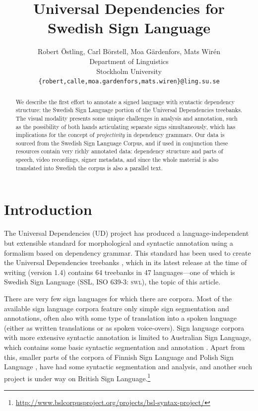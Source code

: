 \documentclass[11pt]{article}
\title{Universal Dependencies for Swedish Sign Language}
\author{Robert {\"O}stling, Carl B{\"o}rstell,
    Moa G{\"a}rdenfors, Mats Wir{\'e}n \\
  Department of Linguistics \\
  Stockholm University \\
  {\tt \{robert,calle,moa.gardenfors,mats.wiren\}@ling.su.se} \\}
\date{}
\begin{document}
\maketitle
\begin{abstract}
    We describe the first effort to annotate a signed language with syntactic
    dependency structure: the Swedish Sign Language portion of the
    Universal Dependencies treebanks.
    The visual modality presents some unique challenges in analysis and
    annotation, such as the possibility of
    both hands articulating separate signs simultaneously, which has
    implications for the concept of \emph{projectivity} in dependency grammars.
    Our data is sourced from the Swedish Sign Language Corpus,
    and if used in conjunction these resources contain very richly
    annotated data: dependency structure and parts of speech,
    video recordings, signer metadata, and since the whole material is
    also translated into Swedish the corpus is also a parallel text.
\end{abstract}

\section{Introduction}

The Universal Dependencies (UD) project \cite{Nivre2016ud} 
has produced a language-independent but extensible standard for
morphological and syntactic annotation using a formalism based on
dependency grammar. This standard has been used to create the Universal
Dependencies treebanks \cite{ud14}, which in its latest release at the time of
writing (version 1.4) contains 64 treebanks in 47 languages---one of which is
Swedish Sign Language (SSL, ISO 639-3: \textsc{swl}), the topic of this
article.

There are very few sign languages for which there are corpora. Most of the available
sign language corpora feature only simple sign segmentation and annotations, 
often also with some type of translation into a spoken language (either as written 
translations or as spoken voice-overs). Sign language corpora with more extensive 
syntactic annotation is limited to Australian Sign Language, 
which contains some basic syntactic segmentation and annotation 
\cite{Johnston2014annotation}. Apart from this, smaller parts of the corpora of Finnish Sign 
Language \cite{Jantunen2016corpus} and Polish Sign Language \cite{Rutkowski2016corpus}, 
have had some syntactic segmentation and analysis, and another such project is under way 
on British Sign Language.\footnote{\url{http://www.bslcorpusproject.org/projects/bsl-syntax-project/}}
\end{document}

